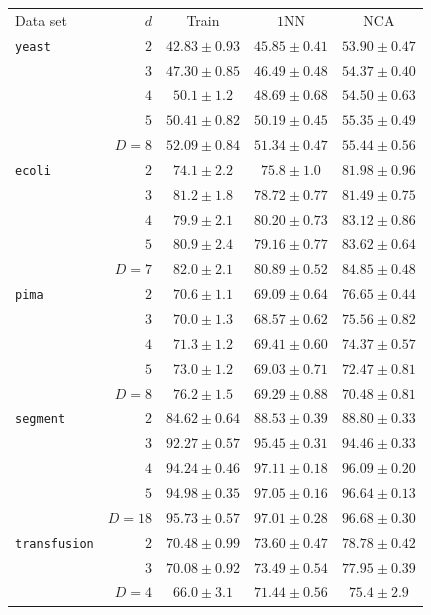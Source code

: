 \begin{table}
  \centering\begin{tabular}{lrccc}
  \toprule
   Data set & $d$ & Train & $1$NN & NCA \\
    \cmidrule(r){3-3}\cmidrule(r){4-4} \cmidrule(r){5-5}
    \texttt{yeast}&$2$&$42.83 \pm 0.93$&$45.85 \pm 0.41$&$53.90 \pm 0.47$\\ 
    &$3$&$47.30 \pm 0.85$&$46.49 \pm 0.48$&$54.37 \pm 0.40$\\ 
    &$4$&$50.1 \pm 1.2$&$48.69 \pm 0.68$&$54.50 \pm 0.63$\\ 
    &$5$&$50.41 \pm 0.82$&$50.19 \pm 0.45$&$55.35 \pm 0.49$\\ 
    &$D=8$&$52.09 \pm 0.84$&$51.34 \pm 0.47$&$55.44 \pm 0.56$\\ 
    \midrule
    \texttt{ecoli}&$2$&$74.1 \pm 2.2$&$75.8 \pm 1.0$&$81.98 \pm 0.96$\\ 
    &$3$&$81.2 \pm 1.8$&$78.72 \pm 0.77$&$81.49 \pm 0.75$\\ 
    &$4$&$79.9 \pm 2.1$&$80.20 \pm 0.73$&$83.12 \pm 0.86$\\ 
    &$5$&$80.9 \pm 2.4$&$79.16 \pm 0.77$&$83.62 \pm 0.64$\\ 
    &$D=7$&$82.0 \pm 2.1$&$80.89 \pm 0.52$&$84.85 \pm 0.48$\\ 
    \midrule
    \texttt{pima}&$2$&$70.6 \pm 1.1$&$69.09 \pm 0.64$&$76.65 \pm 0.44$\\ 
    &$3$&$70.0 \pm 1.3$&$68.57 \pm 0.62$&$75.56 \pm 0.82$\\ 
    &$4$&$71.3 \pm 1.2$&$69.41 \pm 0.60$&$74.37 \pm 0.57$\\ 
    &$5$&$73.0 \pm 1.2$&$69.03 \pm 0.71$&$72.47 \pm 0.81$\\ 
    &$D=8$&$76.2 \pm 1.5$&$69.29 \pm 0.88$&$70.48 \pm 0.81$\\ 
    \midrule
    \texttt{segment}&$2$&$84.62 \pm 0.64$&$88.53 \pm 0.39$&$88.80 \pm 0.33$\\ 
    &$3$&$92.27 \pm 0.57$&$95.45 \pm 0.31$&$94.46 \pm 0.33$\\ 
    &$4$&$94.24 \pm 0.46$&$97.11 \pm 0.18$&$96.09 \pm 0.20$\\ 
    &$5$&$94.98 \pm 0.35$&$97.05 \pm 0.16$&$96.64 \pm 0.13$\\ 
    &$D=18$&$95.73 \pm 0.57$&$97.01 \pm 0.28$&$96.68 \pm 0.30$\\ 
    \midrule
    \texttt{transfusion}&$2$&$70.48 \pm 0.99$&$73.60 \pm 0.47$&$78.78 \pm 0.42$\\ 
    &$3$&$70.08 \pm 0.92$&$73.49 \pm 0.54$&$77.95 \pm 0.39$\\ 
    &$D=4$&$66.0 \pm 3.1$&$71.44 \pm 0.56$&$75.4 \pm 2.9$\\ 
    \bottomrule
   \end{tabular}
\end{table}


